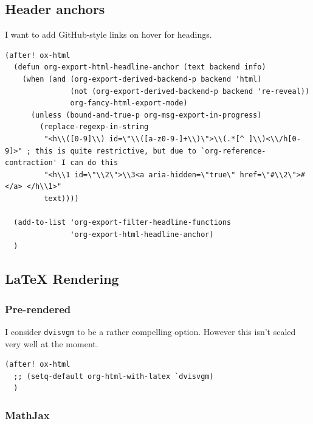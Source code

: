 \documentclass[11pt]{article}
\begin{document}
\subsection{Header anchors}
\label{sec:org3b0aa7f}
I want to add GitHub-style links on hover for headings.
\begin{verbatim}
(after! ox-html
  (defun org-export-html-headline-anchor (text backend info)
    (when (and (org-export-derived-backend-p backend 'html)
               (not (org-export-derived-backend-p backend 're-reveal))
               org-fancy-html-export-mode)
      (unless (bound-and-true-p org-msg-export-in-progress)
        (replace-regexp-in-string
         "<h\\([0-9]\\) id=\"\\([a-z0-9-]+\\)\">\\(.*[^ ]\\)<\\/h[0-9]>" ; this is quite restrictive, but due to `org-reference-contraction' I can do this
         "<h\\1 id=\"\\2\">\\3<a aria-hidden=\"true\" href=\"#\\2\">#</a> </h\\1>"
         text))))

  (add-to-list 'org-export-filter-headline-functions
               'org-export-html-headline-anchor)
  )
\end{verbatim}
\subsection{\LaTeX{} Rendering}
\label{sec:org172069a}
\subsubsection{Pre-rendered}
\label{sec:org6e87b9e}

I consider \texttt{dvisvgm} to be a rather compelling option. However this isn't scaled
very well at the moment.
\begin{verbatim}
(after! ox-html
  ;; (setq-default org-html-with-latex `dvisvgm)
  )
\end{verbatim}
\subsubsection{MathJax}
\label{sec:org7b3582e}
\end{document}
